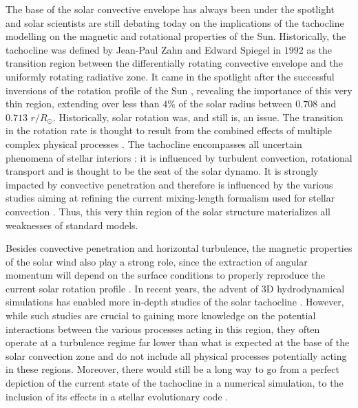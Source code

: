 \documentclass[a4paper,fleqn,usenatbib]{mnras}
\begin{document}
	The base of the solar convective envelope has always been under the spotlight and solar scientists are still debating today on the implications of the tachocline modelling on the magnetic and rotational properties of the Sun. Historically, the tachocline was defined by Jean-Paul Zahn and Edward Spiegel in $1992$ as the transition region between the differentially rotating convective envelope and the uniformly rotating radiative zone. It came in the spotlight after the successful inversions of the rotation profile of the Sun \citep{Kosovichev88Rota}, revealing the importance of this very thin region, extending over less than $4\%$ of the solar radius \citep{corbard99,Elliott99Tacho} between $0.708$ and $0.713$ $r/R_{\odot}$. Historically, solar rotation was, and still is, an issue. The transition in the rotation rate is thought to result from the combined effects of multiple complex physical processes \citep[see][for example]{SpiegelZahn1992, KumarWaves, Spruit99}. The tachocline encompasses all uncertain phenomena of stellar interiors \citep[see][and references therein]{Hughes2007}: it is influenced by turbulent convection, rotational transport and is thought to be the seat of the solar dynamo. It is strongly impacted by convective penetration \citep[see][for a recent study]{JCD11Overshoot} and therefore is influenced by the various studies aiming at refining the current mixing-length formalism used for stellar convection \citep{ZahnMixLength, ZhangTurbConvI, ZhangTurbConvII, Zhang13NonLoc}.  Thus, this very thin region of the solar structure materializes all weaknesses of standard models. 
	
	Besides convective penetration and horizontal turbulence, the magnetic properties of the solar wind also play a strong role, since the extraction of angular momentum will depend on the surface conditions to properly reproduce the current solar rotation profile  \citep[see][for a complete review]{Hughes2007}. In recent years, the advent of 3D hydrodynamical simulations has enabled more in-depth studies of the solar tachocline \citep{Garaud2002I, Garaud2008TachoII, Acevedo2013TachoIII}. However, while such studies are crucial to gaining more knowledge on the potential interactions between the various processes acting in this region, they often operate at a turbulence regime far lower than what is expected at the base of the solar convection zone and do not include all physical processes potentially acting in these regions. Moreover, there would still be a long way to go from a perfect depiction of the current state of the tachocline in a numerical simulation, to the inclusion of its effects in a stellar evolutionary code \citep{Brun3D}. 
\end{document}
